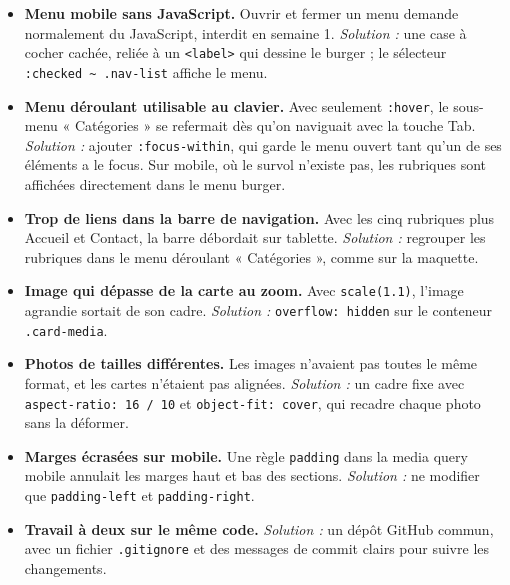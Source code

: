 \documentclass[12pt,a4paper]{article}
\newcommand{\code}[1]{\texttt{#1}}
\begin{document}
\begin{itemize}[leftmargin=*]
  \item \textbf{Menu mobile sans JavaScript.} Ouvrir et fermer un menu
    demande normalement du JavaScript, interdit en semaine 1.
    \textit{Solution :} une case à cocher cachée, reliée à un
    \code{<label>} qui dessine le burger ; le sélecteur
    \code{:checked \~{} .nav-list} affiche le menu.

  \item \textbf{Menu déroulant utilisable au clavier.} Avec seulement
    \code{:hover}, le sous-menu « Catégories » se refermait dès qu'on
    naviguait avec la touche Tab. \textit{Solution :} ajouter
    \code{:focus-within}, qui garde le menu ouvert tant qu'un de ses
    éléments a le focus. Sur mobile, où le survol n'existe pas, les
    rubriques sont affichées directement dans le menu burger.

  \item \textbf{Trop de liens dans la barre de navigation.} Avec les cinq
    rubriques plus Accueil et Contact, la barre débordait sur tablette.
    \textit{Solution :} regrouper les rubriques dans le menu déroulant
    « Catégories », comme sur la maquette.

  \item \textbf{Image qui dépasse de la carte au zoom.} Avec
    \code{scale(1.1)}, l'image agrandie sortait de son cadre.
    \textit{Solution :} \code{overflow: hidden} sur le conteneur
    \code{.card-media}.

  \item \textbf{Photos de tailles différentes.} Les images n'avaient pas
    toutes le même format, et les cartes n'étaient pas alignées.
    \textit{Solution :} un cadre fixe avec \code{aspect-ratio: 16 / 10} et
    \code{object-fit: cover}, qui recadre chaque photo sans la déformer.

  \item \textbf{Marges écrasées sur mobile.} Une règle \code{padding} dans
    la media query mobile annulait les marges haut et bas des sections.
    \textit{Solution :} ne modifier que \code{padding-left} et
    \code{padding-right}.

  \item \textbf{Travail à deux sur le même code.} \textit{Solution :} un
    dépôt GitHub commun, avec un fichier \code{.gitignore} et des messages
    de commit clairs pour suivre les changements.
\end{itemize}

\end{document}
